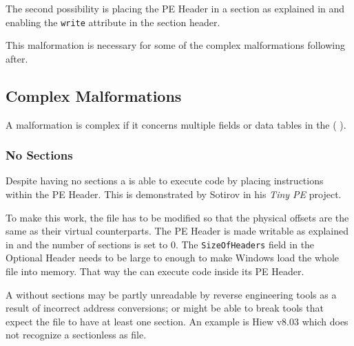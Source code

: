 The second possibility is placing the PE Header in a section as explained in \emph{} and enabling the \texttt{write} attribute in the section header.

This malformation is necessary for some of the complex malformations following after.

\subsection{Complex Malformations}

A malformation is complex if it concerns multiple fields or data tables in the \PE{} (\cf{} \cite[slide 7]{vuksan11}).

\subsubsection*{No Sections}

Despite having no sections a \PE{} is able to execute code by placing instructions within the PE Header. This is demonstrated by Sotirov in his \emph{Tiny PE} project. \cite{tinype}

To make this work, the file has to be modified so that the physical offsets are the same as their virtual counterparts. The PE Header is made writable as explained in \emph{} and the number of sections is set to 0. The \texttt{SizeOfHeaders} field in the Optional Header needs to be large to enough to make Windows load the whole file into memory. That way the \PE{} can execute code inside its PE Header.

A \PE{} without sections may be partly unreadable by reverse engineering tools as a result of incorrect address conversions; or might be able to break tools that expect the file to have at least one section. An example is Hiew v8.03 which does not recognize a sectionless \PE{} as \PE{} file.
